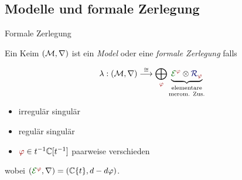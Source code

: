 \subsection{Modelle und formale Zerlegung}
\begin{frame}[t]{Formale Zerlegung}
  \def\myPhi{\textcolor{red!60!black}{\phi}}
  \def\myE{\textcolor{green!40!black}{\cE^{\myPhi}}}
  \begin{defn}
    Ein Keim $(\mathcal{M},\nabla)$ ist ein \emph{Model} oder eine \emph{formale
    Zerlegung} falls
    \begin{multicols}{2}
      \[
        \lambda:(\cM,\nabla)
        \overset{\cong}{\longrightarrow}
        \bigoplus_{~\tikzmark{e3}\!\!\myPhi}
        \underset{\text{merom. Zus.}}{%
          \underset{\text{elementare}}{%
            \underbrace{%
              \overset{\tikzmark{e2}}{\myE}
              \otimes
              \overset{\tikzmark{e1}}{\textcolor{blue!40!black}{\cR_{\myPhi}}}
            }
          }
        }
      \]
      \columnbreak
      \begin{itemize}
        \item[\tikzmarkb{n2}{green}] irregulär singulär
        \item[\tikzmarkc{n1}{blue}] regulär singulär
        \item[\tikzmarkc{n3}{red}] $\myPhi\in t^{-1}\C[t^{-1}]$ paarweise
          verschieden
      \end{itemize}
    \end{multicols}
    wobei $(\myE,\nabla)=(\C\{t\},d-d\phi)$.
  \end{defn}
\end{frame}
